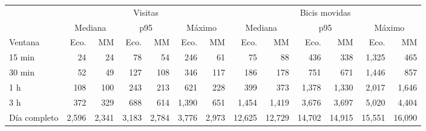 \begin{tabular}{@{}lrrrrrrrrrrrr@{}}
\toprule
 & \multicolumn{6}{c}{Visitas} & \multicolumn{6}{c}{Bicis movidas} \\
\cmidrule(lr){2-7}\cmidrule(l){8-13}
 & \multicolumn{2}{c}{Mediana} & \multicolumn{2}{c}{p95} & \multicolumn{2}{c}{Máximo} & \multicolumn{2}{c}{Mediana} & \multicolumn{2}{c}{p95} & \multicolumn{2}{c}{Máximo} \\
Ventana & Eco. & MM & Eco. & MM & Eco. & MM & Eco. & MM & Eco. & MM & Eco. & MM \\
\midrule
15 min & 24 & 24 & 78 & 54 & 246 & 61 & 75 & 88 & 436 & 338 & 1,325 & 465 \\
30 min & 52 & 49 & 127 & 108 & 346 & 117 & 186 & 178 & 751 & 671 & 1,446 & 857 \\
1 h & 108 & 100 & 243 & 213 & 621 & 228 & 399 & 373 & 1,378 & 1,330 & 2,017 & 1,646 \\
3 h & 372 & 329 & 688 & 614 & 1,390 & 651 & 1,454 & 1,419 & 3,676 & 3,697 & 5,020 & 4,404 \\
Día completo & 2,596 & 2,341 & 3,183 & 2,784 & 3,776 & 2,973 & 12,625 & 12,729 & 14,702 & 14,915 & 15,551 & 16,090 \\
\bottomrule
\end{tabular}
